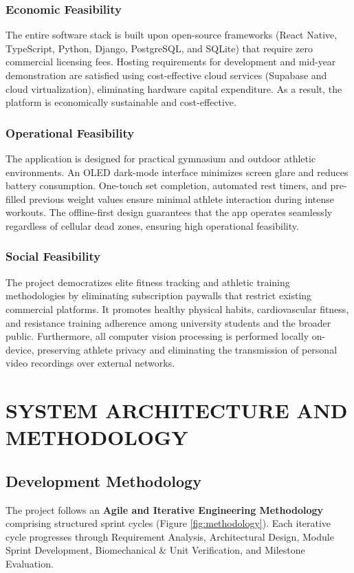 \documentclass[12pt,a4paper]{report}
\begin{document}
\subsection{Economic Feasibility}
The entire software stack is built upon open-source frameworks (React Native, TypeScript, Python, Django, PostgreSQL, and SQLite) that require zero commercial licensing fees. Hosting requirements for development and mid-year demonstration are satisfied using cost-effective cloud services (Supabase and cloud virtualization), eliminating hardware capital expenditure. As a result, the platform is economically sustainable and cost-effective.

\subsection{Operational Feasibility}
The application is designed for practical gymnasium and outdoor athletic environments. An OLED dark-mode interface minimizes screen glare and reduces battery consumption. One-touch set completion, automated rest timers, and pre-filled previous weight values ensure minimal athlete interaction during intense workouts. The offline-first design guarantees that the app operates seamlessly regardless of cellular dead zones, ensuring high operational feasibility.

\subsection{Social Feasibility}
The project democratizes elite fitness tracking and athletic training methodologies by eliminating subscription paywalls that restrict existing commercial platforms. It promotes healthy physical habits, cardiovascular fitness, and resistance training adherence among university students and the broader public. Furthermore, all computer vision processing is performed locally on-device, preserving athlete privacy and eliminating the transmission of personal video recordings over external networks.

\chapter{SYSTEM ARCHITECTURE AND METHODOLOGY}

\section{Development Methodology}
The project follows an \textbf{Agile and Iterative Engineering Methodology} comprising structured sprint cycles (Figure \ref{fig:methodology}). Each iterative cycle progresses through Requirement Analysis, Architectural Design, Module Sprint Development, Biomechanical \& Unit Verification, and Milestone Evaluation.
\end{document}
